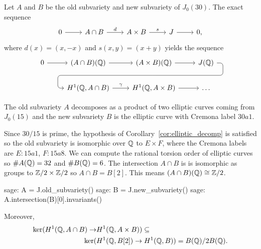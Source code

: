 Let $A$ and $B$ be the old subvariety and new subvariety of $J_0(30)$. The
exact sequence
\begin{equation}
    \label{j30_ses}
    \begin{tikzcd}
        0 \arrow[r] &
        A\cap B \arrow[r,"d"] &
        A\times B \arrow[r,"s"] &
        J \arrow[r] &
        0,
    \end{tikzcd}
\end{equation}
where $d(x)=(x,-x)$ and $s(x,y)=(x+y)$ yields the sequence
\begin{equation}\label{j30_gal_co}
        \begin{tikzcd}
            0 \rar &
            (A\cap B)(\QQ) \rar &
            (A\times B)(\QQ) \rar
                 \ar[draw=none]{d}[name=X, anchor=center]{}
            & J(\QQ) \ar[rounded corners,
                to path={ -- ([xshift=2ex]\tikztostart.east)
                          |- (X.center) \tikztonodes
                          -| ([xshift=-2ex]\tikztotarget.west)
                          -- (\tikztotarget)}]{dll}[at end]{} \\
                          &
            H^1(\QQ,A\cap B) \rar["\gamma"] &
            H^1(\QQ,A\times B) \rar & \ldots
        \end{tikzcd}
\end{equation}

The old subvariety $A$ decomposes
as a product of two elliptic curves coming from $J_0(15)$ and the new
subvariety $B$ is the elliptic curve with Cremona label $30a1$.

Since $30/15$ is prime, the hypothesis of Corollary~\ref{cor:elliptic_decomp} is
satisfied so the old subvariety is isomorphic over $\mathbb{Q}$ to $E\times F$, where
the Cremona labels are $E:15a1$, $F:15a8$. We can compute the rational torsion
order of elliptic curves so $\#A(\mathbb{Q})=32$ and $\#B(\mathbb{Q})=6$. The intersection
$A\cap B$ is is isomorphic as groups to $\mathbb{Z}/2\times \mathbb{Z}/2$ so $A\cap B= B[2]$.
This means $(A\cap B)(\mathbb{Q})\cong \mathbb{Z}/2$. 
\begin{sagecode}
\begin{sagecell}
sage: A = J.old_subvariety()
sage: B = J.new_subvariety()
sage: A.intersection(B)[0].invariants()
\end{sagecell}
\begin{sageout}
[2, 2]
\end{sageout}
\end{sagecode}

Moreover, 
\begin{equation}
    \begin{split}
        \ker (H^1(\mathbb{Q}, A\cap B) \to&H^1(\mathbb{Q}, A\times B))
    \subseteq 
    \\
    \ker (&H^1(\mathbb{Q}, B[2]) \to H^1(\mathbb{Q},  B))
    =
    B(\mathbb{Q})/2B(\mathbb{Q}).
    \end{split}
\end{equation}

